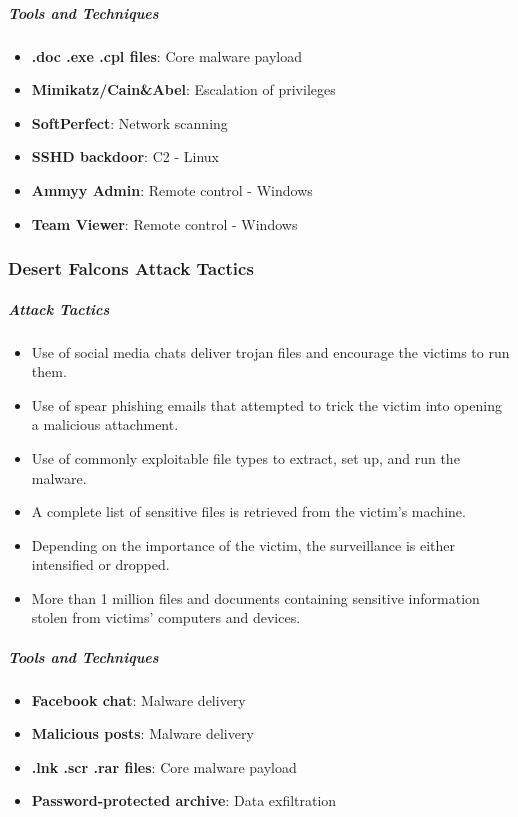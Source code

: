\subparagraph{Tools and Techniques}
\begin{itemize}
    \item \textbf{.doc .exe .cpl files}: Core malware payload
    \item \textbf{Mimikatz/Cain\&Abel}: Escalation of privileges
    \item \textbf{SoftPerfect}: Network scanning
    \item \textbf{SSHD backdoor}: C2 - Linux
    \item \textbf{Ammyy Admin}: Remote control - Windows
    \item \textbf{Team Viewer}: Remote control - Windows
\end{itemize}

\subsubsection{Desert Falcons Attack Tactics}
\subparagraph{Attack Tactics}
\begin{itemize}
    \item Use of social media chats deliver trojan files and encourage the victims to run them.
    \item Use of spear phishing emails that attempted to trick the victim into opening a malicious attachment.
    \item Use of commonly exploitable file types to extract, set up, and run the malware.
    \item A complete list of sensitive files is retrieved from the victim's machine.
    \item Depending on the importance of the victim, the surveillance is either intensified or dropped.
    \item More than 1 million files and documents containing sensitive information stolen from victims' computers and devices.
\end{itemize}

\subparagraph{Tools and Techniques}
\begin{itemize}
    \item \textbf{Facebook chat}: Malware delivery
    \item \textbf{Malicious posts}: Malware delivery
    \item \textbf{.lnk .scr .rar files}: Core malware payload
    \item \textbf{Password-protected archive}: Data exfiltration 
\end{itemize}

